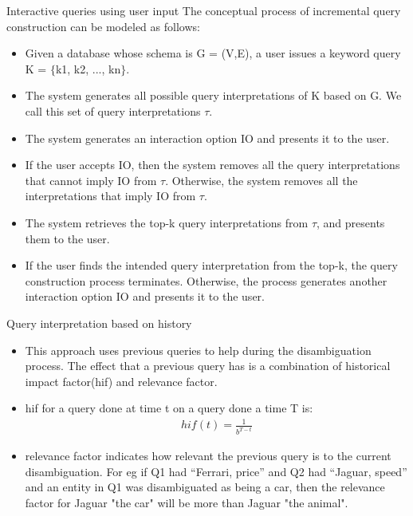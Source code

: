 \documentclass[pdf,11pt]{beamer}
\begin{document}
\begin{frame}{Interactive queries using user input}
The conceptual process of incremental query construction can be modeled as follows:
\begin{itemize}
\item 
Given a database whose schema is G = (V,E), a user
issues a keyword query K = $\{$k1, k2, ..., kn$\}$. 
\item The system generates all possible query interpretations of K based on G. We call this set of query interpretations $\tau$. 
\item The system generates an interaction option IO and presents it to the user. 
\item If the user accepts IO, then the system removes all the query interpretations that cannot imply IO from $\tau$. Otherwise, the system removes all the interpretations that imply IO from $\tau$.
\item The system retrieves the top-k query interpretations
from $\tau$, and presents them to the user. 
\item If the user finds the intended query interpretation from the top-k, the query construction process terminates. Otherwise, the process generates another interaction option IO and
presents it to the user.
\end{itemize} 
\end{frame}

\begin{frame}{Query interpretation based on history}
\begin{itemize}
\item 
This approach uses previous queries to help during the disambiguation process. The effect that a previous query has is a combination of historical impact factor(hif) and relevance factor.

\item hif for a query done at time t on a query done a time T is:
\begin{align}
hif(t) = \frac{1}{b^{T-t}}
\end{align}

\item relevance factor indicates how relevant the previous query is to the current disambiguation. For eg if Q1 had “Ferrari, price” and Q2 had “Jaguar, speed” and an entity in Q1 was disambiguated as being a car, then the relevance factor for Jaguar "the car" will be more than Jaguar "the animal".

\end{itemize}
\end{frame}
\end{document}
